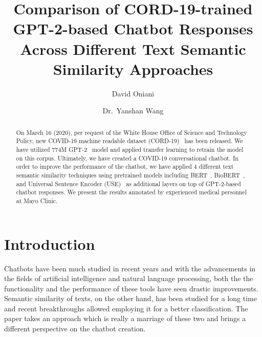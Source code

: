 \documentclass[sigconf,natbib=false]{acmart}
\title{Comparison of CORD-19-trained GPT-2-based Chatbot Responses Across
  Different Text Semantic Similarity Approaches}
\author{David Oniani}
\affiliation{%
  \institution{Mayo Clinic}
  \city{Rochester}
  \state{MN}
  \country{USA}}
\author{Dr.~Yanshan Wang}
\affiliation{%
  \institution{Mayo Clinic}
  \city{Rochester}
  \state{MN}
  \country{USA}}
\begin{document}

\begin{abstract}

  On March 16 (2020), per request of the White House Office of Science and
  Technology Policy, new COVID-19 machine readable dataset
  (CORD-19)~\cite{whitehousecovid2020} has been released. We have utilized 774M
  GPT-2~\cite{radford2019language} model and applied transfer learning to
  retrain the model on this corpus. Ultimately, we have created a COVID-19
  conversational chatbot. In order to improve the performance of the chatbot,
  we have applied 4 different text semantic similarity techniques using
  pretrained models including BERT~\cite{turc2019}, BioBERT~\cite{btz682}, and
  Universal Sentence Encoder (USE)~\cite{use} as additional layers on top of
  GPT-2-based chatbot responses. We present the results annotated by
  experienced medical personnel at Mayo Clinic.

\end{abstract}


\maketitle


\section{Introduction}

Chatbots have been much studied in recent years and with the advancements in
the fields of artificial intelligence and natural language processing, both the
the functionality and the performance of these tools have seen drastic
improvements. Semantic similarity of texts, on the other hand, has been studied
for a long time and recent breakthroughs allowed employing it for a better
classification. The paper takes an approach which is really a marriage of these
two and brings a different perspective on the chatbot creation.
\end{document}
